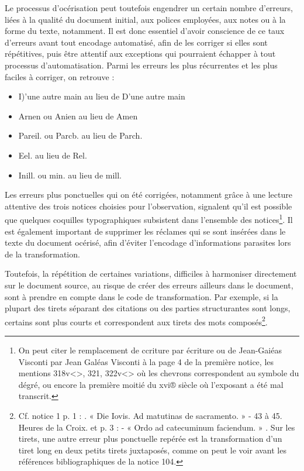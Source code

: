 \documentclass[a4paper,12pt,twoside]{book}
\begin{document}
	Le processus d'océrisation peut toutefois engendrer un certain nombre d'erreurs, liées à la qualité du document initial, aux polices employées, aux notes ou à la forme du texte, notamment. Il est donc essentiel d'avoir conscience de ce taux d'erreurs avant tout encodage automatisé, afin de les corriger si elles sont répétitives, puis être attentif aux exceptions qui pourraient échapper à tout processus d'automatisation.
	Parmi les erreurs les plus récurrentes et les plus faciles à corriger, on retrouve :
	\begin{itemize}
	    \item \og I)’une autre main\fg{} au lieu de \og D’une autre main\fg{}
	    \item \og Arnen\fg{} ou \og Anien\fg{} au lieu de \og Amen\fg{}
	    \item \og Pareil.\fg{} ou \og Parcb.\fg{} au lieu de \og Parch.\fg{}
	    \item \og Eel.\fg{} au lieu de \og Rel.\fg{}
	    \item \og Inill.\fg{} ou \og min.\fg{} au lieu de \og mill.\fg{}
	\end{itemize}
	
	Les erreurs plus ponctuelles qui on été corrigées, notamment grâce à une lecture attentive des trois notices choisies pour l'observation, signalent qu'il est possible que quelques coquilles typographiques subsistent dans l'ensemble des notices\footnote{On peut citer le remplacement de \og ccriture\fg{} par \og écriture\fg{} ou de \og Jean-Gaiéas Visconti\fg{} par \og Jean Galéas Visconti\fg{} à la page 4 de la première notice, les mentions \og 318v<>, 321, 322v<> \fg{} où les chevrons correspondent au symbole du dégré, ou encore \og la première moitié du xvi® siècle\fg{} où l'exposant a été mal transcrit.}. Il est également important de supprimer les réclames qui se sont insérées dans le texte du document océrisé, afin d'éviter l'encodage d'informations parasites lors de la transformation.
	
	Toutefois, la répétition de certaines variations, difficiles à harmoniser directement sur le document source, au risque de créer des erreurs ailleurs dans le document, sont à prendre en compte dans le code de transformation. Par exemple, si la plupart des tirets séparant des citations ou des parties structurantes sont longs, certains sont plus courts et correspondent aux tirets des mots composés\footnote{Cf. notice 1 p. 1 : . « Die Iovis. Ad matutinas de sacramento. » - 43 à 45. Heures de la Croix.\fg{} et p. 3 : - « Ordo ad catecuminum faciendum. » \fg{}. Sur les tirets, une autre erreur plus ponctuelle repérée est la transformation d'un tiret long en deux petits tirets juxtaposés, comme on peut le voir avant les références bibliographiques de la notice 104.}. 
	
\end{document}
